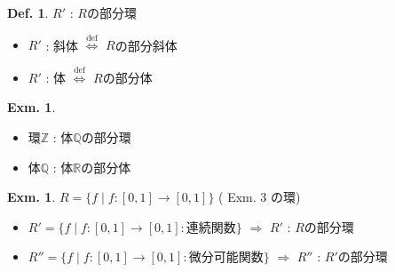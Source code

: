\documentclass[uplatex,dvipdfmx,9pt]{beamer}
\newcommand{\defarrow}{\overset{\mathrm{def}}{\Leftrightarrow}}
\newcounter{textExmCount}
\theoremstyle{definition} %
\newtheorem{defn}{Def.}[subsection] %
\theoremstyle{example}
\newtheorem{exmText}[textExmCount]{Exm.}
\begin{document}
    \begin{frame}

      \begin{defn}
        $R'$ : $R$の部分環 \\
        \begin{itemize}
          \item $R'$ : 斜体 $\defarrow$ $R$の\alert{部分斜体}
          \item $R'$ : 体 $\defarrow$ $R$の\alert{部分体}
        \end{itemize}
      \end{defn}

      \begin{exmText}
        \begin{itemize}
          \item 環$\mathbb{Z}$ : 体$\mathbb{Q}$の部分環
          \item 体$\mathbb{Q}$ : 体$\mathbb{R}$の部分体
        \end{itemize}
      \end{exmText}
 
      \begin{exmText}
        $R = \{f \mid f\colon [0,1] \to [0,1]\}$ ( Exm. 3 の環)
        \begin{itemize}
          \item $R' = \{f \mid f\colon [0,1] \to [0,1] : \text{連続関数}\}$ $\Rightarrow$ $R'$ : $R$の部分環
          \item $R'' = \{f \mid f\colon [0,1] \to [0,1] : \text{微分可能関数}\}$ $\Rightarrow$ $R''$ : $R'$の部分環
        \end{itemize}
      \end{exmText}

    \end{frame}
\end{document}
